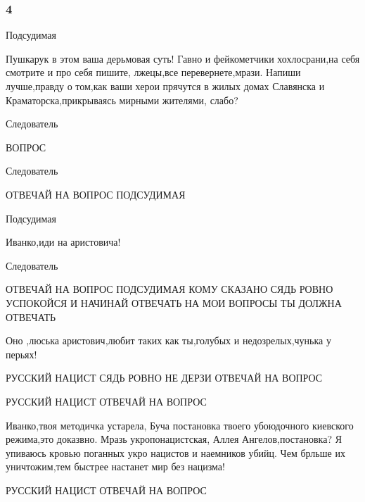  
 
 
 
 

\subsubsection{4}

Подсудимая 

Пушкарук в этом ваша дерьмовая суть! Гавно и фейкометчики хохлосрани,на себя
смотрите и про себя пишите, лжецы,все перевернете,мрази. Напиши лучше,правду о
том,как ваши херои прячутся в жилых домах Славянска и Краматорска,прикрываясь
мирными жителями, слабо?

Следователь

ВОПРОС

Следователь

ОТВЕЧАЙ НА ВОПРОС ПОДСУДИМАЯ

Подсудимая 

Иванко,иди на аристовича!

Следователь

ОТВЕЧАЙ НА ВОПРОС ПОДСУДИМАЯ КОМУ СКАЗАНО СЯДЬ РОВНО УСПОКОЙСЯ И НАЧИНАЙ
ОТВЕЧАТЬ НА МОИ ВОПРОСЫ ТЫ ДОЛЖНА ОТВЕЧАТЬ

\qqPodsudimyj

Оно ,люська аристович,любит таких как ты,голубых и недозрелых,чунька у перьях!

\qqSledovatel

РУССКИЙ НАЦИСТ СЯДЬ РОВНО НЕ ДЕРЗИ ОТВЕЧАЙ НА ВОПРОС

\qqSledovatel

РУССКИЙ НАЦИСТ ОТВЕЧАЙ НА ВОПРОС

\qqSledovatel

\qqSudVopros

\qqPodsudimyj

Иванко,твоя методичка устарела, Буча постановка твоего убоюдочного киевского
режима,это доказвно. Мразь укропонацистская, Аллея Ангелов,постановка? Я
упиваюсь кровью поганных укро нацистов и наемников убийц. Чем брльше их
уничтожим,тем быстрее настанет мир без нацизма!

\qqSledovatel

РУССКИЙ НАЦИСТ ОТВЕЧАЙ НА ВОПРОС


